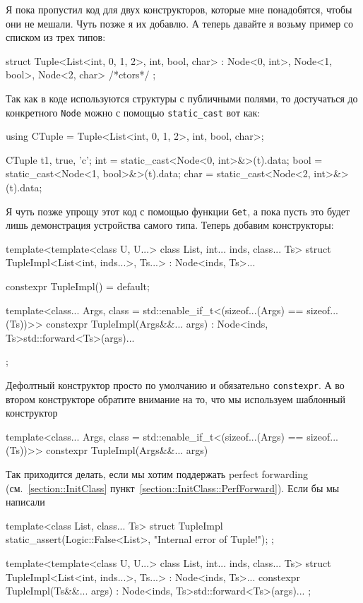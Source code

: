 Я пока пропустил код для двух конструкторов, которые мне понадобятся, чтобы они не мешали.
Чуть позже я их добавлю.
А теперь давайте я возьму пример со списком из трех типов:
\begin{cppcode}[\nonumbers]
struct Tuple<List<int, 0, 1, 2>, int, bool, char> : Node<0, int>, Node<1, bool>, Node<2, char> {
  /*ctors*/
};
\end{cppcode}
Так как в коде используются структуры с публичными полями, то достучаться до конкретного \verb"Node" можно с помощью \verb"static_cast" вот как:
\begin{cppcode}[\nonumbers]
using CTuple = Tuple<List<int, 0, 1, 2>, int, bool, char>;

CTuple t{1, true, 'c'};
int = static_cast<Node<0, int>&>(t).data;
bool = static_cast<Node<1, bool>&>(t).data;
char = static_cast<Node<2, int>&>(t).data;
\end{cppcode}
Я чуть позже упрощу этот код с помощью функции \verb"Get", а пока пусть это будет лишь демонстрация устройства самого типа.
Теперь добавим конструкторы:
\begin{cppcode}
template<template<class U, U...> class List, int... inds, class... Ts>
struct TupleImpl<List<int, inds...>, Ts...> : Node<inds, Ts>... {
  constexpr TupleImpl() = default;
  
  template<class... Args, class = std::enable_if_t<(sizeof...(Args) == sizeof...(Ts))>>
  constexpr TupleImpl(Args&&... args)
      : Node<inds, Ts>{std::forward<Ts>(args)}... {
  }
};
\end{cppcode}
Дефолтный конструктор просто по умолчанию и обязательно \verb"constexpr".
А во втором конструкторе обратите внимание на то, что мы используем шаблонный конструктор
\begin{cppcode}
template<class... Args, class = std::enable_if_t<(sizeof...(Args) == sizeof...(Ts))>>
constexpr TupleImpl(Args&&... args)
\end{cppcode}
Так приходится делать, если мы хотим поддержать perfect forwarding (см.~\ref{section::InitClass} пункт~\ref{section::InitClass::PerfForward}).
Если бы мы написали 
\begin{cppcode}
template<class List, class... Ts>
struct TupleImpl {
  static_assert(Logic::False<List>, "Internal error of Tuple!");
};

template<template<class U, U...> class List, int... inds, class... Ts>
struct TupleImpl<List<int, inds...>, Ts...> : Node<inds, Ts>... {
  constexpr TupleImpl(Ts&&... args)
      : Node<inds, Ts>{std::forward<Ts>(args)}... {
  }
};
\end{cppcode}
